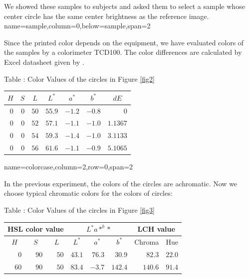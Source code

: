 \documentclass[portrait,final,a0paper]{baposter}
\begin{document}
\begin{poster}
{ We showed these samples to subjects and
 asked them to select a sample whose center circle has the same center
 brightness as the reference image. }
 {name=sample,column=0,below=sample,span=2}
 {Since the printed color depends on the equipment,
 we have evaluated colors of the samples by a colorimeter
 TCD100\cite{TCD100}. The color differences are calculated by Excel
 datasheet given by \cite{CIEDE2000}.
  \begin{center}
Table : Color Values of the circles in
   Figure \ref{fig2}\\
 \begin{tabular}[t]{|*{7}{r|}}\hline
\multicolumn{1}{|c|}{$H$} &
\multicolumn{1}{c|}{$S$} &
\multicolumn{1}{c|}{$L$} &
\multicolumn{1}{|c|}{$L^*$} &
\multicolumn{1}{c|}{$a^*$} &
\multicolumn{1}{c|}{$b^*$} &
\multicolumn{1}{|c|}{$dE$} \\\hline
  $0$&$0$ &$50$ &$55.9$ &$-1.2$ & $-0.8$& $0$\\\hline
  $0$&$0$ &$52$ &$57.1$ &$-1.1$ &$-1.0$ &$1.1367$ \\\hline
  $0$&$0$ &$54$ &$59.3$ &$-1.4$ &$-1.0$ & $3.1133$\\\hline
  $0$&$0$ &$56$ &$61.6$ &$-1.1$ &$-0.9$ & $5.1065$\\\hline
 \end{tabular}
\end{center}
}
 {name=colorcase,column=2,row=0,span=2}{
 In the previous experiment, the colors of the circles are achromatic.
 Now we choose typical chromatic colors for the colors of circles:
   \begin{center}
Table : Color Values of the circles in
   Figure \ref{fig3}\\
	\begin{tabular}[t]{|*{8}{r|}}\hline
	 \multicolumn{3}{|c|}{HSL color value}&
	 \multicolumn{3}{c|}{$L^*a*^b*$}&
	 \multicolumn{2}{c|}{LCH value}\\\hline
\multicolumn{1}{|c|}{$H$} &
\multicolumn{1}{c|}{$S$} &
\multicolumn{1}{c|}{$L$} &
\multicolumn{1}{|c|}{$L^*$} &
\multicolumn{1}{c|}{$a^*$} &
\multicolumn{1}{c|}{$b^*$}&
\multicolumn{1}{c|}{\small Chroma}&
\multicolumn{1}{c|}{Hue}
			\\\hline
    $0$&$90$ &$50$ &$43.1$ &$	76.3$ &  $30.9$ & $82.3$&$22.0$\\\hline
   $60$&$90$ &$50$ &$83.4$ & $-3.7$ & $142.4$ &$140.6$ &$91.4$\\\hline

\end{tabular}
\end{center}}
\end{poster}
\end{document}
